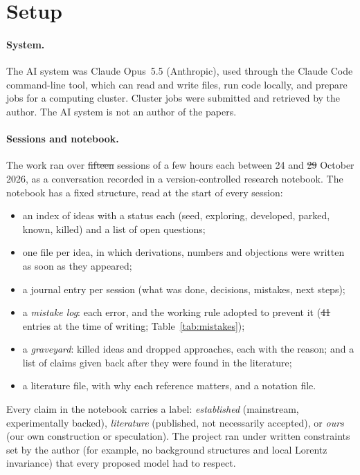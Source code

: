 \documentclass[11pt,a4paper]{article}
\makeatletter
\providecommand{\DIFaddtex}[1]{{\protect\color{blue}\uwave{#1}}} %
\providecommand{\DIFdeltex}[1]{{\protect\color{red}\sout{#1}}} %
\providecommand{\DIFaddbegin}{} %
\providecommand{\DIFaddend}{} %
\providecommand{\DIFdelbegin}{} %
\providecommand{\DIFdelend}{} %
\providecommand{\DIFadd}[1]{\texorpdfstring{\DIFaddtex{#1}}{#1}} %
\providecommand{\DIFdel}[1]{\texorpdfstring{\DIFdeltex{#1}}{}} %
\let\sout@orig\sout %
\renewcommand{\sout}[1]{\ifmmode\text{\sout@orig{\ensuremath{#1}}}\else\sout@orig{#1}\fi} %
\makeatother
\begin{document}
\section{Setup}
\paragraph{System.} The AI system was Claude Opus~5.5 (Anthropic), used through the Claude Code command-line tool, which can read and write files, run code locally, and prepare jobs for a computing cluster. Cluster jobs were submitted and retrieved by the author. The AI system is not an author of the papers.

\paragraph{Sessions and notebook.} The work ran over \DIFdelbegin \DIFdel{fifteen }\DIFdelend \DIFaddbegin \DIFadd{twenty }\DIFaddend sessions of a few hours each between 24 and \DIFdelbegin \DIFdel{29 }\DIFdelend \DIFaddbegin \DIFadd{31 }\DIFaddend October 2026, as a conversation recorded in a version-controlled research notebook. The notebook has a fixed structure, read at the start of every session:
\begin{itemize}[itemsep=1pt]
\item an index of ideas with a status each (seed, exploring, developed, parked, known, killed) and a list of open questions;
\item one file per idea, in which derivations, numbers and objections were written as soon as they appeared;
\item a journal entry per session (what was done, decisions, mistakes, next steps);
\item a \emph{mistake log}: each error, and the working rule adopted to prevent it (\DIFdelbegin \DIFdel{41 }\DIFdelend \DIFaddbegin \DIFadd{53 }\DIFaddend entries at the time of writing; Table~\ref{tab:mistakes});
\item a \emph{graveyard}: killed ideas and dropped approaches, each with the reason; and a list of claims given back after they were found in the literature;
\item a literature file, with why each reference matters, and a notation file.
\end{itemize}
Every claim in the notebook carries a label: \emph{established} (mainstream, experimentally backed), \emph{literature} (published, not necessarily accepted), or \emph{ours} (our own construction or speculation). The project ran under written constraints set by the author (for example, no background structures and local Lorentz invariance) that every proposed model had to respect.
\end{document}
